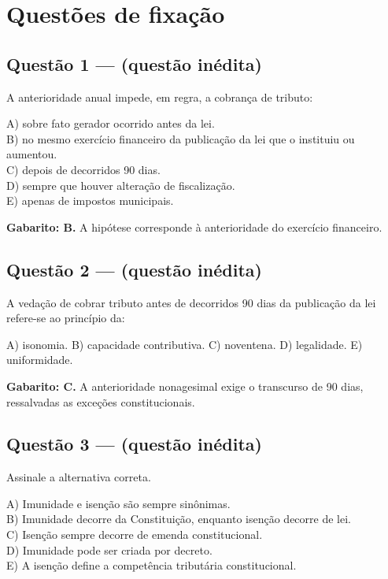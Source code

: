 \documentclass[11pt,a4paper]{article}
\begin{document}
\section*{Questões de fixação}

\subsection*{Questão 1 — (questão inédita)}

A anterioridade anual impede, em regra, a cobrança de tributo:

A) sobre fato gerador ocorrido antes da lei. \\ B) no mesmo exercício financeiro da publicação da lei que o instituiu ou aumentou. \\ C) depois de decorridos 90 dias. \\ D) sempre que houver alteração de fiscalização. \\ E) apenas de impostos municipais.

\begin{alerta}
\textbf{Gabarito: B.} A hipótese corresponde à anterioridade do exercício financeiro.
\end{alerta}

\subsection*{Questão 2 — (questão inédita)}

A vedação de cobrar tributo antes de decorridos 90 dias da publicação da lei refere-se ao princípio da:

A) isonomia. B) capacidade contributiva. C) noventena. D) legalidade. E) uniformidade.

\begin{alerta}
\textbf{Gabarito: C.} A anterioridade nonagesimal exige o transcurso de 90 dias, ressalvadas as exceções constitucionais.
\end{alerta}

\subsection*{Questão 3 — (questão inédita)}

Assinale a alternativa correta.

A) Imunidade e isenção são sempre sinônimas. \\ B) Imunidade decorre da Constituição, enquanto isenção decorre de lei. \\ C) Isenção sempre decorre de emenda constitucional. \\ D) Imunidade pode ser criada por decreto. \\ E) A isenção define a competência tributária constitucional.
\end{document}
